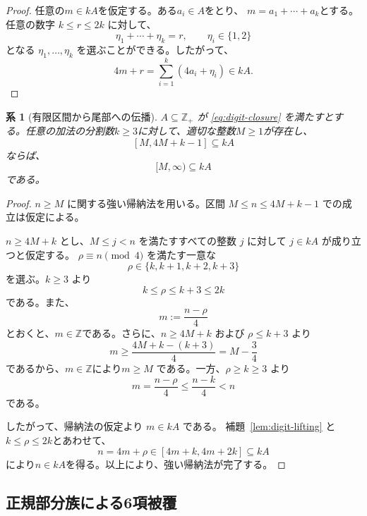 \documentclass[12pt]{ltjsarticle}
\theoremstyle{plain}
\newtheorem{corollary}[theorem]{系}
\theoremstyle{definition}
\theoremstyle{plain}
\begin{document}
\begin{proof}
任意の$m\in kA$を仮定する。ある$a_i\in A$をとり、
$m=a_1+\cdots+a_k$とする。任意の数字
$k\leq r\leq2k$ に対して、
\[
 \eta_1+\cdots+\eta_k=r,
 \qquad \eta_i\in\{1,2\}
\]
となる $\eta_1,\ldots,\eta_k$ を選ぶことができる。したがって、
\[
 4m+r=\sum_{i=1}^{k}(4a_i+\eta_i)\in kA.
\]
\end{proof}

\begin{corollary}[有限区間から尾部への伝播]
\label{cor:tail-propagation}
$A\subseteq\mathbb{Z}_+$ が
\eqref{eq:digit-closure} を満たすとする。任意の加法の分割数$k\geq3$に対して、適切な整数$M\geq1$が存在し、
\begin{equation}\label{eq:tail-seed}
 [M,4M+k-1]\subseteq kA
\end{equation}
ならば、
\[
 [M,\infty)\subseteq kA
\]
である。
\end{corollary}

\begin{proof}
$n\geq M$ に関する強い帰納法を用いる。区間
$M\leq n\leq4M+k-1$ での成立は仮定による。

$n\geq4M+k$ とし、$M\leq j<n$ を満たすすべての整数 $j$ に対して
$j\in kA$ が成り立つと仮定する。
$\rho\equiv n\pmod4$ を満たす一意な
\[
 \rho\in\{k,k+1,k+2,k+3\}
\]
を選ぶ。$k\geq3$ より
\[
 k\leq\rho\leq k+3\leq2k
\]
である。また、
\[
 m:=\frac{n-\rho}{4}
\]
とおくと、$m\in\mathbb{Z}$である。さらに、$n\geq4M+k$ および
$\rho\leq k+3$ より
\[
 m\geq\frac{4M+k-(k+3)}{4}
   =M-\frac34
\]
であるから、$m\in\mathbb{Z}$により$m\geq M$ である。一方、$\rho\geq k\geq3$ より
\[
 m=\frac{n-\rho}{4}
 \leq\frac{n-k}{4}
 <n
\]
である。

したがって、帰納法の仮定より $m\in kA$ である。
補題~\ref{lem:digit-lifting} と$k\leq\rho\leq2k$とあわせて、
\[
 n=4m+\rho\in [4m+k,4m+2k]\subseteq kA
\]
により$n\in kA$を得る。以上により、強い帰納法が完了する。
\end{proof}


\subsection{正規部分族による6項被覆}
\end{document}
